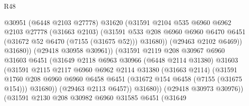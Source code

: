 \begin{lexlean}{R48}
\begin{coremodule}
                                  @30951
                                  (@6448 @2103 @27778)
                                  @31620
                                  (@31591
                                    @2104
                                    @535
                                    @6960
                                    @6962
                                    @2103
                                    @27778
                                    (@31663 @2103)
                                    (@31591
                                      @533
                                      @208
                                      @6960
                                      @6960
                                      @6470
                                      @6451
                                      (@31672 @52 @6470 (@7155 (@31675 @52)))
                                      @31680))
                                  (@29463 @2102 @6469))
                                @31680))
                            (@29418 @30958 @30961))
                          (@31591
                            @2119
                            @208
                            @30967
                            @6960
                            @31603
                            @6451
                            (@31649
                              @2118
                              @6963
                              @30966
                              (@6448 @2114 @31380)
                              @31603
                              (@31591
                                @2115
                                @2117
                                @6960
                                @6962
                                @2114
                                @31380
                                (@31663 @2114)
                                (@31591
                                  @1760
                                  @208
                                  @6960
                                  @6960
                                  @6458
                                  @6451
                                  (@31672 @154 @6458 (@7155 (@31675 @154)))
                                  @31680))
                              (@29463 @2113 @6457))
                            @31680))
                        (@29418 @30973 @30976))
                      (@31591
                        @2130
                        @208
                        @30982
                        @6960
                        @31585
                        @6451
                        (@31649

\end{coremodule}
\end{lexlean}
